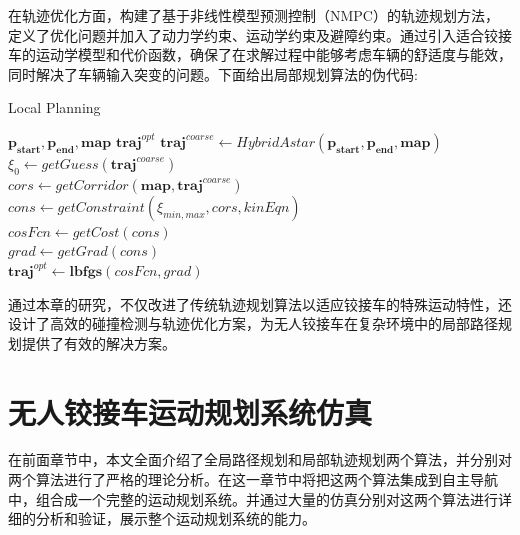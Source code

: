 \documentclass[master,academic]{ysuthesis} %
\begin{document}
	在轨迹优化方面，构建了基于非线性模型预测控制（NMPC）的轨迹规划方法，定义了优化问题并加入了动力学约束、运动学约束及避障约束。通过引入适合铰接车的运动学模型和代价函数，确保了在求解过程中能够考虑车辆的舒适度与能效，同时解决了车辆输入突变的问题。下面给出局部规划算法的伪代码:
	\begin{algorithm}[H]  
		\caption{Local Planning}  
		\label{alg:local_planning}  
		\begin{algorithmic}[1]  
			\REQUIRE  
			$\mathbf{p_{start}},\mathbf{p_{end}},\mathbf{map}$
			\ENSURE  
			$\mathbf{traj}^{opt}$
			\STATE $\mathbf{traj}^{coarse} \leftarrow HybridAstar(\mathbf{p_{start}},\mathbf{p_{end}},\mathbf{map})$\\
			\STATE $\xi_0 \leftarrow getGuess(\mathbf{traj}^{coarse})$\\
			\STATE $cors \leftarrow getCorridor(\mathbf{map},\mathbf{traj}^{coarse})$\\
			\STATE $cons \leftarrow getConstraint(\xi_{min,max},cors,kinEqn)$\\
			\STATE $cosFcn \leftarrow getCost(cons)$\\
			\STATE $grad \leftarrow getGrad(cons)$ \\
		   \RETURN $\mathbf{traj}^{opt} \leftarrow \mathbf{lbfgs}(cosFcn,grad)$
		\end{algorithmic}  
	\end{algorithm}

	通过本章的研究，不仅改进了传统轨迹规划算法以适应铰接车的特殊运动特性，还设计了高效的碰撞检测与轨迹优化方案，为无人铰接车在复杂环境中的局部路径规划提供了有效的解决方案。
	
	\chapter{无人铰接车运动规划系统仿真}
	在前面章节中，本文全面介绍了全局路径规划和局部轨迹规划两个算法，并分别对两个算法进行了严格的理论分析。在这一章节中将把这两个算法集成到自主导航中，组合成一个完整的运动规划系统。并通过大量的仿真分别对这两个算法进行详细的分析和验证，展示整个运动规划系统的能力。
	
\end{document}
